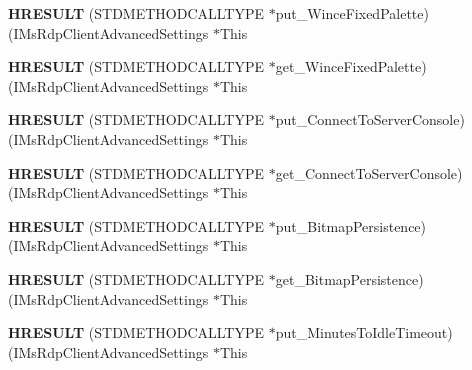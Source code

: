 \begin{DoxyCompactItemize}
{\bfseries H\+R\+E\+S\+U\+LT} (S\+T\+D\+M\+E\+T\+H\+O\+D\+C\+A\+L\+L\+T\+Y\+PE $\ast$put\+\_\+\+Wince\+Fixed\+Palette)(I\+Ms\+Rdp\+Client\+Advanced\+Settings $\ast$This
\item 
\mbox{\label{struct_i_ms_rdp_client_advanced_settings_vtbl_ae99e6cd8281e7efdd3265b93c07b10e1}} 
{\bfseries H\+R\+E\+S\+U\+LT} (S\+T\+D\+M\+E\+T\+H\+O\+D\+C\+A\+L\+L\+T\+Y\+PE $\ast$get\+\_\+\+Wince\+Fixed\+Palette)(I\+Ms\+Rdp\+Client\+Advanced\+Settings $\ast$This
\item 
\mbox{\label{struct_i_ms_rdp_client_advanced_settings_vtbl_a4ec14a9048329d22d5055020f5784523}} 
{\bfseries H\+R\+E\+S\+U\+LT} (S\+T\+D\+M\+E\+T\+H\+O\+D\+C\+A\+L\+L\+T\+Y\+PE $\ast$put\+\_\+\+Connect\+To\+Server\+Console)(I\+Ms\+Rdp\+Client\+Advanced\+Settings $\ast$This
\item 
\mbox{\label{struct_i_ms_rdp_client_advanced_settings_vtbl_ad968807702234a57b23e336ea5cac00f}} 
{\bfseries H\+R\+E\+S\+U\+LT} (S\+T\+D\+M\+E\+T\+H\+O\+D\+C\+A\+L\+L\+T\+Y\+PE $\ast$get\+\_\+\+Connect\+To\+Server\+Console)(I\+Ms\+Rdp\+Client\+Advanced\+Settings $\ast$This
\item 
\mbox{\label{struct_i_ms_rdp_client_advanced_settings_vtbl_a077a8ad39c1989f533a3c8b22f152eaa}} 
{\bfseries H\+R\+E\+S\+U\+LT} (S\+T\+D\+M\+E\+T\+H\+O\+D\+C\+A\+L\+L\+T\+Y\+PE $\ast$put\+\_\+\+Bitmap\+Persistence)(I\+Ms\+Rdp\+Client\+Advanced\+Settings $\ast$This
\item 
\mbox{\label{struct_i_ms_rdp_client_advanced_settings_vtbl_aea372dc95cc352ab63c7e63cc5b76571}} 
{\bfseries H\+R\+E\+S\+U\+LT} (S\+T\+D\+M\+E\+T\+H\+O\+D\+C\+A\+L\+L\+T\+Y\+PE $\ast$get\+\_\+\+Bitmap\+Persistence)(I\+Ms\+Rdp\+Client\+Advanced\+Settings $\ast$This
\item 
\mbox{\label{struct_i_ms_rdp_client_advanced_settings_vtbl_a19a06b174620c091519634ae5ebc4ab1}} 
{\bfseries H\+R\+E\+S\+U\+LT} (S\+T\+D\+M\+E\+T\+H\+O\+D\+C\+A\+L\+L\+T\+Y\+PE $\ast$put\+\_\+\+Minutes\+To\+Idle\+Timeout)(I\+Ms\+Rdp\+Client\+Advanced\+Settings $\ast$This

\end{DoxyCompactItemize}
